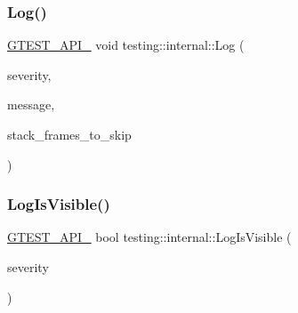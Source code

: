 \mbox{\label{namespacetesting_1_1internal_a8a57ce0412334a3f487bbaa8321febbe}} 
\subsubsection{\texorpdfstring{Log()}{Log()}}
{\footnotesize\ttfamily \mbox{\hyperlink{_obj__test_2lib_2googletest-release-1_88_81_2googletest_2include_2gtest_2internal_2gtest-port_8h_aa73be6f0ba4a7456180a94904ce17790}{G\+T\+E\+S\+T\+\_\+\+A\+P\+I\+\_\+}} void testing\+::internal\+::\+Log (\begin{DoxyParamCaption}\item[{\mbox{\hyperlink{namespacetesting_1_1internal_a203d1a8a2147a53d12bbdae40d443914}{Log\+Severity}}}]{severity,  }\item[{const std\+::string \&}]{message,  }\item[{int}]{stack\+\_\+frames\+\_\+to\+\_\+skip }\end{DoxyParamCaption})}

\mbox{\label{namespacetesting_1_1internal_a69ffdba5ee36743e88d8f89b79e566ff}} 
\subsubsection{\texorpdfstring{LogIsVisible()}{LogIsVisible()}}
{\footnotesize\ttfamily \mbox{\hyperlink{_obj__test_2lib_2googletest-release-1_88_81_2googletest_2include_2gtest_2internal_2gtest-port_8h_aa73be6f0ba4a7456180a94904ce17790}{G\+T\+E\+S\+T\+\_\+\+A\+P\+I\+\_\+}} bool testing\+::internal\+::\+Log\+Is\+Visible (\begin{DoxyParamCaption}\item[{\mbox{\hyperlink{namespacetesting_1_1internal_a203d1a8a2147a53d12bbdae40d443914}{Log\+Severity}}}]{severity }\end{DoxyParamCaption})}

\mbox{\label{namespacetesting_1_1internal_a06b1b20029fbd1dbeb59752f914fab84}} 
